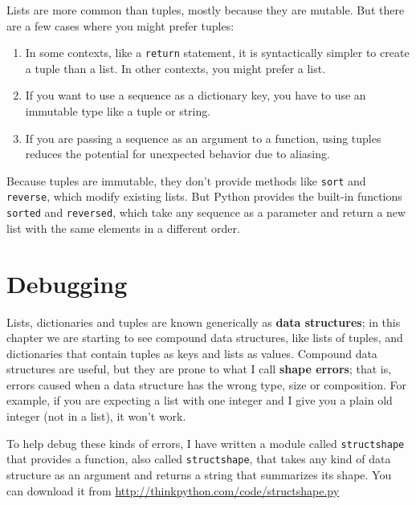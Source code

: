 \documentclass[10pt]{book}
\begin{document}
\begin{CJK}{UTF8}{gbsn}
Lists are more common than tuples, mostly because they are mutable.
But there are a few cases where you might prefer tuples:

\begin{enumerate}

\item In some contexts, like a {\tt return} statement, it is
syntactically simpler to create a tuple than a list.  In other
contexts, you might prefer a list.

\item If you want to use a sequence as a dictionary key, you
have to use an immutable type like a tuple or string.

\item If you are passing a sequence as an argument to a function,
using tuples reduces the potential for unexpected behavior
due to aliasing.

\end{enumerate}

Because tuples are immutable, they don't provide methods
like {\tt sort} and {\tt reverse}, which modify existing lists.
But Python provides the built-in functions {\tt sorted}
and {\tt reversed}, which take any sequence as a parameter
and return a new list with the same elements in a different
order.


\section{Debugging}

Lists, dictionaries and tuples are known generically as {\bf data
  structures}; in this chapter we are starting to see compound data
structures, like lists of tuples, and dictionaries that contain tuples
as keys and lists as values.  Compound data structures are useful, but
they are prone to what I call {\bf shape errors}; that is, errors
caused when a data structure has the wrong type, size or composition.
For example, if you are expecting a list with one integer and I
give you a plain old integer (not in a list), it won't work.


To help debug these kinds of errors, I have written a module
called {\tt structshape} that provides a function, also called
{\tt structshape}, that takes any kind of data structure as
an argument and returns a string that summarizes its shape.
You can download it from \url{http://thinkpython.com/code/structshape.py}


\end{CJK}
\end{document}
